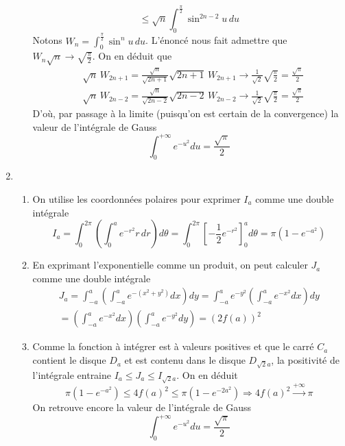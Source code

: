 \begin{enumerate}
\begin{enumerate}
\begin{displaymath}
 \leq \sqrt{n}\int_0^{\frac{\pi}{2}}\sin^{2n-2}u\,du 
\end{displaymath}
Notons $W_n= \int_0^{\frac{\pi}{2}}\sin^{n}u\,du$. L'énoncé nous fait admettre que $W_n \sqrt{n} \rightarrow \sqrt{\frac{\pi}{2}}$. On en déduit que 
\begin{align*}
 & \sqrt{n}\,W_{2n+1}=\frac{\sqrt{n}}{\sqrt{2n+1}}\sqrt{2n+1}\,W_{2n+1}
\rightarrow
\frac{1}{\sqrt{2}}\sqrt{\frac{\pi}{2}}=\frac{\sqrt{\pi}}{2} \\
& \sqrt{n}\,W_{2n-2}=\frac{\sqrt{n}}{\sqrt{2n-2}}\sqrt{2n-2}\,W_{2n-2}
\rightarrow
\frac{1}{\sqrt{2}}\sqrt{\frac{\pi}{2}}=\frac{\sqrt{\pi}}{2}
\end{align*}
D'où, par passage à la limite (puisqu'on est certain de la convergence) la valeur de l'intégrale de Gauss
\begin{displaymath}
 \int_0^{+\infty}e^{-u^2}du = \frac{\sqrt{\pi}}{2}
\end{displaymath}
\end{enumerate}

 \item
\begin{enumerate}
 \item On utilise les coordonnées polaires pour exprimer $I_a$ comme une double intégrale
\begin{displaymath}
 I_a = \int_{0}^{2\pi}\left(\int_0^ae^{-r^2}r\,dr \right) d\theta
=\int_{0}^{2\pi}\left[-\frac{1}{2}e^{-r^2} \right]_0^a d\theta = \pi(1-e^{-a^2})
\end{displaymath}

 \item En exprimant l'exponentielle comme un produit, on peut calculer $J_a$ comme une double intégrale
\begin{multline*}
 J_a = \int_{-a}^a\left(\int_{-a}^a e^{-(x^2+y^2)}dx \right)dy
= \int_{-a}^ae^{-y^2}\left(\int_{-a}^a e^{-x^2}dx \right)dy\\
= \left(\int_{-a}^a e^{-x^2}dx \right)\left( \int_{-a}^ae^{-y^2}dy\right) = (2f(a))^2
\end{multline*}

 \item Comme la fonction à intégrer est à valeurs positives et que le carré $C_a$ contient le disque $D_a$ et est contenu dans le disque $D_{\sqrt{2}a}$, la positivité de l'intégrale entraine $I_a\leq J_a \leq I_{\sqrt{2}a}$. On en déduit
\begin{displaymath}
 \pi(1-e^{-a^2}) \leq 4f(a)^2 \leq \pi(1-e^{-2a^2}) \Rightarrow 4f(a)^2\xrightarrow{+\infty} \pi  
\end{displaymath}
On retrouve encore la valeur de l'intégrale de Gauss
\begin{displaymath}
 \int_0^{+\infty}e^{-u^2}du = \frac{\sqrt{\pi}}{2}
\end{displaymath}

\end{enumerate}

\end{enumerate}
